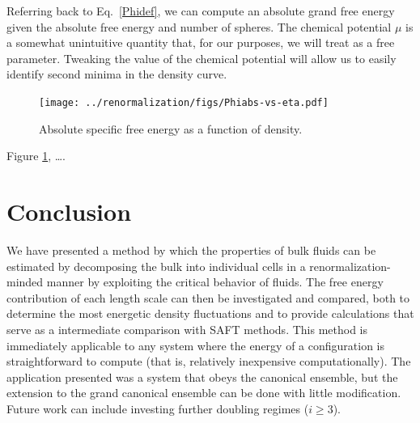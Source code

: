 \documentclass[12pt]{article}
\begin{document}
Referring back to Eq.~\ref{Phidef}, we can compute an absolute grand free energy given the absolute free energy and number of spheres. The chemical potential $\mu$ is a somewhat unintuitive quantity that, for our purposes, we will treat as a free parameter. Tweaking the value of the chemical potential will allow us to easily identify second minima in the density curve. 
\begin{figure}
\centering
    \texttt{[image: ../renormalization/figs/Phiabs-vs-eta.pdf]}
    \caption{Absolute specific free energy as a function of density.}
    \label{Phi-eta}
\end{figure}

Figure \ref{Phi-eta}, \dots.


\section{Conclusion}
We have presented a method by which the properties of bulk fluids can be estimated by decomposing the bulk into individual cells in a renormalization-minded manner by exploiting the critical behavior of fluids. The free energy contribution of each length scale can then be investigated and compared, both to determine the most energetic density fluctuations and to provide calculations that serve as a intermediate comparison with SAFT methods. This method is immediately applicable to any system where the energy of a configuration is straightforward to compute (that is, relatively inexpensive computationally). The application presented was a system that obeys the canonical ensemble, but the extension to the grand canonical ensemble can be done with little modification. Future work can include investing further doubling regimes ($i\geq 3$). 
%
\cleardoublepage

\end{document}
